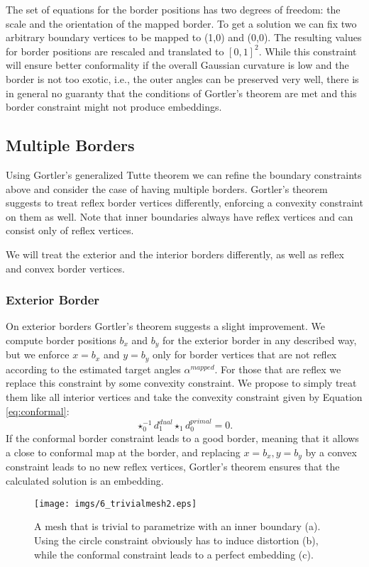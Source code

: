 The set of equations for the border positions has two degrees of freedom: the scale and the orientation  of the mapped border. To get a solution we can fix two arbitrary boundary vertices to be mapped to  (1,0) and (0,0). The resulting values for border positions are rescaled and translated to $[0,1]^2$. While this constraint will ensure better conformality if the overall Gaussian curvature is low and the border is not too exotic, i.e., the outer angles can be preserved very well, there is in general no guaranty that the conditions of Gortler's theorem are met and this border constraint might not produce embeddings.

%

\subsection{Multiple Borders}
Using Gortler's generalized Tutte theorem we can refine the boundary constraints above and consider the case of having multiple borders. Gortler's theorem suggests to treat reflex border vertices differently, enforcing a convexity constraint on them as well. Note that inner boundaries always have reflex vertices and can consist only of reflex vertices.  

We will treat the exterior and the interior borders differently, as well as reflex and convex border vertices. 

\subsubsection{Exterior Border}
On exterior borders Gortler's theorem suggests a slight improvement.
We compute border positions $b_x$ and $b_y$ for the exterior border in any described way, but we enforce $x = b_x$ and $y= b_y$ only for border vertices that are not reflex according to the estimated target angles $\alpha^{mapped}$. For those that are reflex we replace this constraint by some convexity constraint. We propose to simply treat them like all interior vertices and take the convexity constraint given by Equation \ref{eq:conformal}:
\[\star_0^{-1} d_1^{dual} \star_1 d_0^{primal}=0.\]
If the conformal border constraint leads to a good border, meaning that it allows a close to conformal map at the border, and replacing $x=b_x, y=b_y$ by a convex constraint leads to no new reflex vertices, Gortler's theorem ensures that the calculated solution is an embedding.

\begin{figure}%
\texttt{[image: imgs/6\_trivialmesh2.eps]}%
\caption{A mesh that is trivial to parametrize with an inner boundary (a). Using the circle constraint obviously has to induce distortion (b), while the conformal constraint leads to a perfect embedding (c).}%
\label{fig:6_trivialmesh}%
\end{figure}


